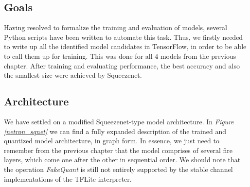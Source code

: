 \subsection{Goals}
Having resolved to formalize the training and evaluation of models, several Python scripts have been written to automate this task. Thus, we firstly needed to write up all the identified model candidates in TensorFlow, in order to be able to call them up for training. This was done for all 4 models from the previous chapter. After training and evaluating performance, the best accuracy and also the smallest size were achieved by Squeezenet.
\subsection{Architecture}
We have settled on a modified Squeezenet-type model architecture. In \textit{Figure \ref{netron_sqnet}} we can find a fully expanded description of the trained and quantized model architecture, in graph form. In essence, we just need to remember from the previous chapter that the model comprises of several fire layers, which come one after the other in sequential order. We should note that the operation \textit{FakeQuant} is still not entirely supported by the stable channel implementations of the TFLite interpreter.

